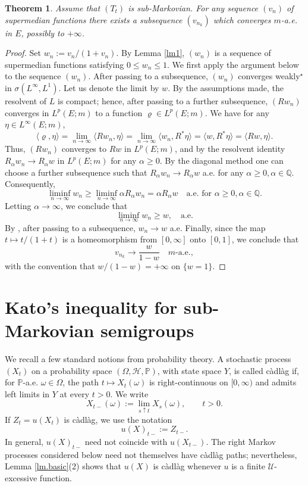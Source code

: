 \documentclass[11pt,a4paper,reqno]{amsart}
\newtheorem{theorem}{\bf Theorem}[section]
\theoremstyle{definition}
\numberwithin{equation}{section}
\begin{document}
\begin{theorem}
\label{lm.upseq}
Assume that $(T_t)$ is sub-Markovian. For any sequence $(v_n)$ of
supermedian functions there exists a subsequence $(v_{n_k})$ which
converges $m$-a.e. in $E$, possibly to $+\infty$.
\end{theorem}
\begin{proof}
Set $w_n:=v_n/(1+v_n)$.
By Lemma \ref{lm1}, $(w_n)$ is a sequence of supermedian functions
satisfying $0\le w_n\le1$.  We first apply the argument below to the
sequence $(w_n)$.
After passing to a subsequence,   $(w_n)$ converges   weakly$^\star$  
in $\sigma(L^\infty,L^1)$. Let us denote the limit by $w$. By the assumptions made, 
the resolvent of $L$ is compact; hence, after passing to a further  
subsequence, $(Rw_n)$  converges in $L^p(E;m)$ to a function $\varrho\in L^p(E;m)$. 
We have for any $\eta\in L^\infty(E;m)$,
\[
\langle \varrho,\eta\rangle=\lim_{n\to \infty}\langle Rw_n,\eta\rangle=\lim_{n\to \infty}\langle w_n,R^*\eta\rangle
=\langle w,R^*\eta\rangle=
\langle Rw,\eta\rangle.
\] 
Thus, $(Rw_n)$ converges to $Rw$ in $L^p(E;m)$,  
and by the resolvent identity $R_\alpha w_n\to R_\alpha w$ in $L^p(E;m)$ for any $\alpha\ge 0$.
By the diagonal method one can choose a further subsequence such that $R_\alpha w_n\to R_\alpha w$ a.e.
for any $\alpha\ge 0,\alpha\in\mathbb Q$. Consequently,
\[
\liminf_{n\to \infty} w_n\ge \liminf_{n\to \infty} \alpha R_\alpha w_n
= \alpha R_\alpha w\quad \text{a.e. for }\alpha\ge 0,\alpha\in\mathbb Q.
\]
Letting $\alpha\to \infty$, we   conclude that
\[
\liminf_{n\to \infty} w_n\ge w,\quad \text{a.e.}
\]
By \cite[Theorem 26, page 28]{DellacherieMeyer}, after passing to a subsequence,  $w_n\to w$ a.e. 
Finally, since the map $t\mapsto t/(1+t)$ is a homeomorphism from
$[0,\infty]$ onto $[0,1]$, we conclude that
\[
v_{n_k}\longrightarrow \frac{w}{1-w}
\quad m\text{-a.e.},
\]
with the convention that $w/(1-w)=+\infty$ on $\{w=1\}$.
\end{proof}

\section{Kato's inequality for sub-Markovian semigroups}
\label{sec4}

We recall a few standard notions from probability theory. 
A stochastic process $(X_t)$  on a probability space  $(\Omega,\mathcal H, \mathbb P)$, 
with state space $Y$, is called c\`adl\`ag if, for $\mathbb P$-a.e. $\omega\in \Omega$, the path
$t\mapsto X_t(\omega)$ is right-continuous on $[0,\infty)$ and admits left limits in $Y$
at every $t>0$. We write
\[
X_{t-}(\omega):=\lim_{s\uparrow t}X_s(\omega),
\qquad t>0.
\]
If $Z_t=u(X_t)$  is c\`adl\`ag, we use the notation
\[
u(X)_{t-}:=Z_{t-}.
\]
In general, $u(X)_{t-}$ need not coincide with $u(X_{t-})$. The right Markov processes considered 
below need not themselves have c\`adl\`ag paths; nevertheless, Lemma \ref{lm.basic}(2) shows that $u(X)$
is c\`adl\`ag whenever $u$ is a finite $\mathcal U$-excessive function.
\end{document}
